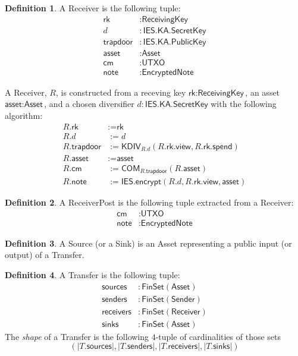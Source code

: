 \documentclass[a4paper]{article}
\theoremstyle{definition}
\newtheorem{definition}{Definition}[subsection]
\renewcommand{\abs}[1]{\left|#1\right|}
\newcommand{\Asset}{{\textsf{Asset}}}
\newcommand{\COM}{{\textsf{COM}}}
\newcommand{\EncryptedNote}{{\textsf{EncryptedNote}}}
\newcommand{\FinSet}{{\textsf{FinSet}}}
\newcommand{\IES}{{\textsf{IES}}}
\newcommand{\KA}{{\textsf{KA}}}
\newcommand{\KDIV}{{\textsf{KDIV}}}
\newcommand{\PublicKey}{{\textsf{PublicKey}}}
\newcommand{\ReceiverPost}{{\textsf{ReceiverPost}}}
\newcommand{\Receiver}{{\textsf{Receiver}}}
\newcommand{\ReceivingKey}{{\textsf{ReceivingKey}}}
\newcommand{\SecretKey}{{\textsf{SecretKey}}}
\newcommand{\Sender}{{\textsf{Sender}}}
\newcommand{\Sink}{{\textsf{Sink}}}
\newcommand{\Source}{{\textsf{Source}}}
\newcommand{\Transfer}{{\textsf{Transfer}}}
\newcommand{\UTXO}{{\textsf{UTXO}}}
\newcommand{\asset}{{\textsf{asset}}}
\newcommand{\cm}{{\textsf{cm}}}
\newcommand{\encrypt}{{\textsf{encrypt}}}
\newcommand{\note}{{\textsf{note}}}
\newcommand{\receivers}{{\textsf{receivers}}}
\newcommand{\rk}{{\textsf{rk}}}
\newcommand{\senders}{{\textsf{senders}}}
\newcommand{\sinks}{{\textsf{sinks}}}
\newcommand{\sources}{{\textsf{sources}}}
\newcommand{\spend}{{\textsf{spend}}}
\newcommand{\trapdoor}{{\textsf{trapdoor}}}
\newcommand{\view}{{\textsf{view}}}
\begin{document}
\begin{definition}
    A \Receiver{} is the following tuple:
    \begin{align*}
        \rk       &: \ReceivingKey \\
        d         &: \IES.\KA.\SecretKey \\
        \trapdoor &: \IES.\KA.\PublicKey \\
        \asset    &: \Asset \\
        \cm       &: \UTXO \\
        \note     &: \EncryptedNote
    \end{align*}
    
    A \Receiver{}, $R$, is constructed from a receving key $\rk : \ReceivingKey$, an asset $\asset : \Asset$, and a chosen diversifier $d : \IES.\KA.\SecretKey$ with the following algorithm:
    \begin{align*}
        R.\rk       &:= \rk \\
        R.d         &:= d \\
        R.\trapdoor &:= \KDIV_{R.d}(R.\rk.\view, R.\rk.\spend) \\
        R.\asset    &:= \asset \\
        R.\cm       &:= \COM_{R.\trapdoor}(R.\asset) \\
        R.\note     &:= \IES.\encrypt(R.d, R.\rk.\view, \asset)
    \end{align*}
\end{definition}

\begin{definition}
    A \ReceiverPost{} is the following tuple extracted from a \Receiver{}:
    \begin{align*}
        \cm       &: \UTXO \\
        \note     &: \EncryptedNote
    \end{align*}
\end{definition}

\begin{definition}
    A \Source{} (or a \Sink{}) is an \Asset{} representing a public input (or output) of a \Transfer{}.
\end{definition}

\begin{definition}
    A \Transfer{} is the following tuple:
    \begin{align*}
        \sources    &: \FinSet(\Asset) \\
        \senders    &: \FinSet(\Sender) \\
        \receivers  &: \FinSet(\Receiver) \\
        \sinks      &: \FinSet(\Asset)
    \end{align*}
    The \emph{shape} of a \Transfer{} is the following $4$-tuple of cardinalities of those sets
    \[\left(\abs{T.\sources}, \abs{T.\senders}, \abs{T.\receivers}, \abs{T.\sinks}\right)\]
\end{definition}
\end{document}
